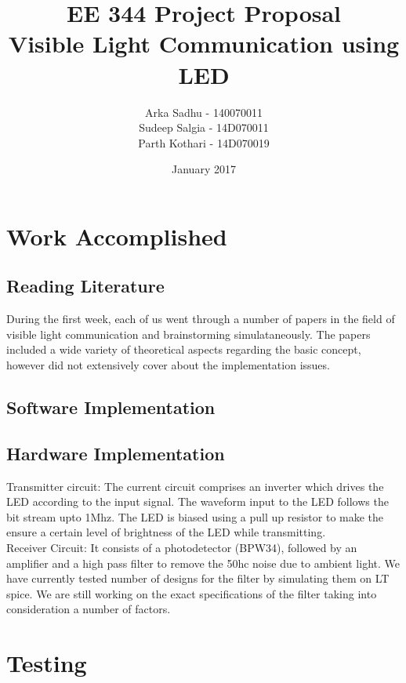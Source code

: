 \documentclass{article}
\title{EE 344 Project Proposal \\ Visible Light Communication using LED}
\author{
  Arka Sadhu - 140070011\\
  Sudeep Salgia - 14D070011\\
  Parth Kothari - 14D070019\\
}
\date{January 2017}
\begin{document}

\section{Work Accomplished }

\subsection{Reading Literature}

During the first week, each of us went through a number of papers in the field of visible light communication and brainstorming simulataneously. The papers included a wide variety of theoretical aspects regarding the basic concept, however did not extensively cover about the implementation issues. 

\subsection{Software Implementation}

\subsection{Hardware Implementation}

Transmitter circuit: The current circuit comprises an inverter which drives the LED according to the input signal. The waveform input to the LED follows the bit stream upto 1Mhz. The LED is biased using a pull up resistor to make the ensure a certain level of brightness of the LED while transmitting. \\

Receiver Circuit: It consists of a photodetector (BPW34), followed by an amplifier and a high pass filter to remove the 50hc noise due to ambient light. We have currently tested number of designs for the filter by simulating them on LT spice. We are still working on the exact specifications of the filter taking into consideration a number of factors.%


\section{Testing}
\end{document}
